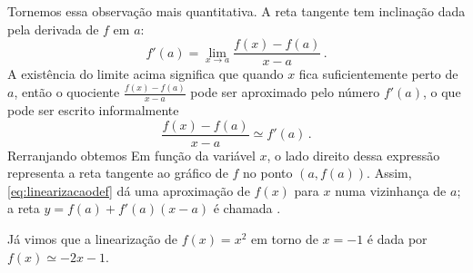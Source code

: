 \begin{center}
\begin{bmlimage}\end{bmlimage}
\end{center}

Tornemos essa observação mais quantitativa.
A reta tangente tem inclinação dada pela derivada de $f$ em $a$:
$$f'(a)=\lim_{x\to a}\frac{f(x)-f(a)}{x-a}\,.$$
A existência do limite acima significa que quando $x$ fica
suficientemente perto de $a$, então o quociente 
$\frac{f(x)-f(a)}{x-a}$ pode ser aproximado pelo número 
$f'(a)$, o que pode ser escrito informalmente
\[\frac{f(x)-f(a)}{x-a}\simeq f'(a)\,.\]
Rerranjando obtemos
Em função da variável $x$, o lado direito dessa expressão
representa a reta tangente ao gráfico de $f$ no ponto $(a,f(a))$. 
Assim, \eqref{eq:linearizacaodef} dá uma aproximação de $f(x)$ para $x$ numa 
vizinhança de $a$; a reta $y=f(a)+f'(a)(x-a)$ é chamada .

\begin{ex} Já vimos que a linearização de $f(x)=x^2$ em torno de $x=-1$ é dada
por $f(x)\simeq -2x-1$. 
\end{ex}

